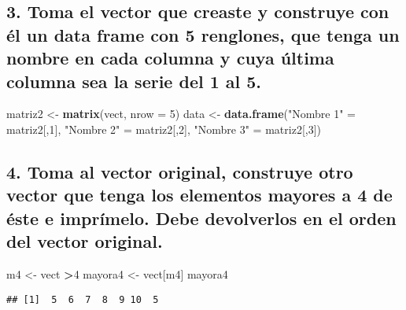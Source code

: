 \documentclass[
]{article}
\newenvironment{Shaded}{\begin{snugshade}}{\end{snugshade}}
\newcommand{\DataTypeTok}[1]{\textcolor[rgb]{0.13,0.29,0.53}{#1}}
\newcommand{\DecValTok}[1]{\textcolor[rgb]{0.00,0.00,0.81}{#1}}
\newcommand{\KeywordTok}[1]{\textcolor[rgb]{0.13,0.29,0.53}{\textbf{#1}}}
\newcommand{\NormalTok}[1]{#1}
\newcommand{\OperatorTok}[1]{\textcolor[rgb]{0.81,0.36,0.00}{\textbf{#1}}}
\newcommand{\StringTok}[1]{\textcolor[rgb]{0.31,0.60,0.02}{#1}}
\begin{document}
\hypertarget{toma-el-vector-que-creaste-y-construye-con-uxe9l-un-data-frame-con-5-renglones-que-tenga-un-nombre-en-cada-columna-y-cuya-uxfaltima-columna-sea-la-serie-del-1-al-5.}{%
\subsection{3. Toma el vector que creaste y construye con él un data
frame con 5 renglones, que tenga un nombre en cada columna y cuya última
columna sea la serie del 1 al
5.}\label{toma-el-vector-que-creaste-y-construye-con-uxe9l-un-data-frame-con-5-renglones-que-tenga-un-nombre-en-cada-columna-y-cuya-uxfaltima-columna-sea-la-serie-del-1-al-5.}}

\begin{Shaded}
\begin{Highlighting}[]
\NormalTok{matriz2 <-}\StringTok{ }\KeywordTok{matrix}\NormalTok{(vect, }\DataTypeTok{nrow =} \DecValTok{5}\NormalTok{)}
\NormalTok{data <-}\StringTok{ }\KeywordTok{data.frame}\NormalTok{(}\StringTok{"Nombre 1"}\NormalTok{ =}\StringTok{ }\NormalTok{matriz2[,}\DecValTok{1}\NormalTok{], }\StringTok{"Nombre 2"}\NormalTok{ =}\StringTok{ }\NormalTok{matriz2[,}\DecValTok{2}\NormalTok{],}
                   \StringTok{"Nombre 3"}\NormalTok{ =}\StringTok{ }\NormalTok{matriz2[,}\DecValTok{3}\NormalTok{])}
\end{Highlighting}
\end{Shaded}

\hypertarget{toma-al-vector-original-construye-otro-vector-que-tenga-los-elementos-mayores-a-4-de-uxe9ste-e-impruxedmelo.-debe-devolverlos-en-el-orden-del-vector-original.}{%
\subsection{4. Toma al vector original, construye otro vector que tenga
los elementos mayores a 4 de éste e imprímelo. Debe devolverlos en el
orden del vector
original.}\label{toma-al-vector-original-construye-otro-vector-que-tenga-los-elementos-mayores-a-4-de-uxe9ste-e-impruxedmelo.-debe-devolverlos-en-el-orden-del-vector-original.}}

\begin{Shaded}
\begin{Highlighting}[]
\NormalTok{m4 <-}\StringTok{ }\NormalTok{vect }\OperatorTok{>}\DecValTok{4}
\NormalTok{mayora4 <-}\StringTok{ }\NormalTok{vect[m4]}
\NormalTok{mayora4}
\end{Highlighting}
\end{Shaded}

\begin{verbatim}
## [1]  5  6  7  8  9 10  5
\end{verbatim}
\end{document}
